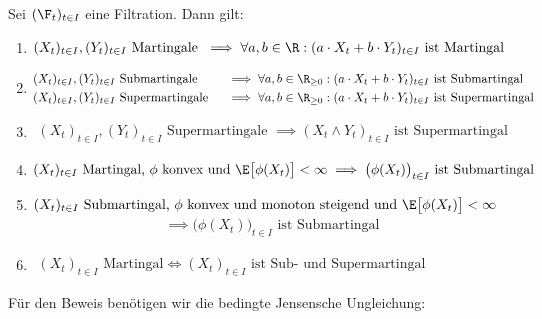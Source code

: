 \begin{proposition}\label{Prop2.1}\enter
Sei $(\F_t)_{t\in I}$ eine Filtration. Dann gilt:
\begin{enumerate}[label=\alph*)]
\item $\begin{aligned}
(X_t)_{t\in I},(Y_t)_{t\in I}\text{ Martingale }
\implies\forall a,b\in\R: (a\cdot X_t+b\cdot Y_t)_{t\in I}\text{ ist Martingal}
\end{aligned}$
\item $\begin{aligned}
		&(X_t)_{t\in I},(Y_t)_{t\in I}\text{ Submartingale }&
&\implies\forall a,b\in\R_{\geq0}: (a\cdot X_t+b\cdot Y_t)_{t\in I}\text{ ist Submartingal}\\
&(X_t)_{t\in I},(Y_t)_{t\in I}\text{ Supermartingale }&
&\implies\forall a,b\in\R_{\geq0}: (a\cdot X_t+b\cdot Y_t)_{t\in I}\text{ ist Supermartingal}
\end{aligned}$
\item $\begin{aligned}
(X_t)_{t\in I},(Y_t)_{t\in I}\text{ Supermartingale }
\implies (X_t\wedge Y_t)_{t\in I}\text{ ist Supermartingal}
\end{aligned}$
\item $\begin{aligned}
(X_t)_{t\in I}\text{ Martingal, $\phi$ konvex und }\E\big[\phi(X_t)\big]<\infty
\implies \big(\phi(X_t)\big)_{t\in I}\text{ ist Submartingal}
\end{aligned}$
\item $(X_t)_{t\in I}\text{ Submartingal, $\phi$ konvex und monoton steigend und }\E\big[\phi(X_t)\big]<\infty$
	\begin{align*}
\implies \big(\phi(X_t)\big)_{t\in I}\text{ ist Submartingal}
\end{align*}
\item $\begin{aligned}
(X_t)_{t\in I}\text{ Martingal}
\Longleftrightarrow
(X_t)_{t\in I}\text{ ist Sub- und Supermartingal}
\end{aligned}$
\end{enumerate}
\end{proposition}

Für den Beweis benötigen wir die bedingte Jensensche Ungleichung:

